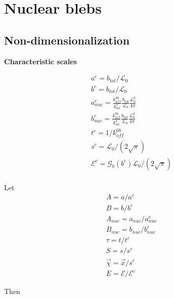 \section{Nuclear blebs}
\label{sec:project2}

\subsection{Non-dimensionalization}
{\bf Characteristic scales}

\[ \begin{array}{ll} 
a^c = b_{tot}/\mathcal{L}_0 \\
b^c = b_{tot}/\mathcal{L}_0\\
a_{nuc}^c = \frac{k_{off}^{0b}}{k_{on}^b} \frac{b_{tot}}{\mathcal{L}_0} \frac{\mathcal{L}_0^2}{4 \pi}\\[7pt]
b_{nuc}^c = \frac{k_{off}^{0b}}{k_{on}^b} \frac{b_{tot}}{\mathcal{L}_0} \frac{ \mathcal{L}_0^2}{4 \pi}\\
t^c = 1/k_{off}^{0b}\\
s^c = \mathcal{L}_0/(2\sqrt{\pi})\\
\mathcal{E}^c = \mathcal{G}_b(b^c) \mathcal{L}_0/(2\sqrt{\pi})\\
\end{array}\]

Let 
\[ \begin{array}{ll}
A = a/a^c\\
B = b/b^c\\
A_{nuc} = a_{nuc}/a_{nuc}^c\\
B_{nuc} = b_{nuc}/b_{nuc}^c\\
\tau = t/t^c\\
S = s/s^c\\
\vec{\chi} = \vec{x} /s^c \\
E = \mathcal{E}/\mathcal{E}^c
\end{array}\]

Then

